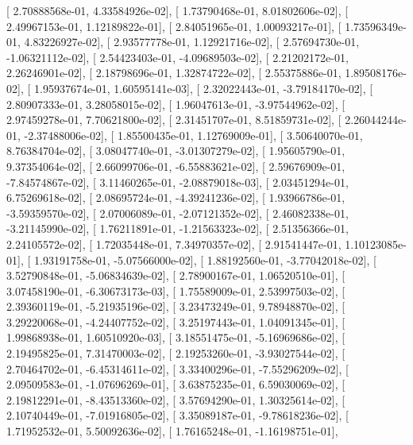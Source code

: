 \documentclass{article}
\begin{document}
       [  2.70888568e-01,   4.33584926e-02],
       [  1.73790468e-01,   8.01802606e-02],
       [  2.49967153e-01,   1.12189822e-01],
       [  2.84051965e-01,   1.00093217e-01],
       [  1.73596349e-01,   4.83226927e-02],
       [  2.93577778e-01,   1.12921716e-02],
       [  2.57694730e-01,  -1.06321112e-02],
       [  2.54423403e-01,  -4.09689503e-02],
       [  2.21202172e-01,   2.26246901e-02],
       [  2.18798696e-01,   1.32874722e-02],
       [  2.55375886e-01,   1.89508176e-02],
       [  1.95937674e-01,   1.60595141e-03],
       [  2.32022443e-01,  -3.79184170e-02],
       [  2.80907333e-01,   3.28058015e-02],
       [  1.96047613e-01,  -3.97544962e-02],
       [  2.97459278e-01,   7.70621800e-02],
       [  2.31451707e-01,   8.51859731e-02],
       [  2.26044244e-01,  -2.37488006e-02],
       [  1.85500435e-01,   1.12769009e-01],
       [  3.50640070e-01,   8.76384704e-02],
       [  3.08047740e-01,  -3.01307279e-02],
       [  1.95605790e-01,   9.37354064e-02],
       [  2.66099706e-01,  -6.55883621e-02],
       [  2.59676909e-01,  -7.84574867e-02],
       [  3.11460265e-01,  -2.08879018e-03],
       [  2.03451294e-01,   6.75269618e-02],
       [  2.08695724e-01,  -4.39241236e-02],
       [  1.93966786e-01,  -3.59359570e-02],
       [  2.07006089e-01,  -2.07121352e-02],
       [  2.46082338e-01,  -3.21145990e-02],
       [  1.76211891e-01,  -1.21563323e-02],
       [  2.51356366e-01,   2.24105572e-02],
       [  1.72035448e-01,   7.34970357e-02],
       [  2.91541447e-01,   1.10123085e-01],
       [  1.93191758e-01,  -5.07566000e-02],
       [  1.88192560e-01,  -3.77042018e-02],
       [  3.52790848e-01,  -5.06834639e-02],
       [  2.78900167e-01,   1.06520510e-01],
       [  3.07458190e-01,  -6.30673173e-03],
       [  1.75589009e-01,   2.53997503e-02],
       [  2.39360119e-01,  -5.21935196e-02],
       [  3.23473249e-01,   9.78948870e-02],
       [  3.29220068e-01,  -4.24407752e-02],
       [  3.25197443e-01,   1.04091345e-01],
       [  1.99868938e-01,   1.60510920e-03],
       [  3.18551475e-01,  -5.16969686e-02],
       [  2.19495825e-01,   7.31470003e-02],
       [  2.19253260e-01,  -3.93027544e-02],
       [  2.70464702e-01,  -6.45314611e-02],
       [  3.33400296e-01,  -7.55296209e-02],
       [  2.09509583e-01,  -1.07696269e-01],
       [  3.63875235e-01,   6.59030069e-02],
       [  2.19812291e-01,  -8.43513360e-02],
       [  3.57694290e-01,   1.30325614e-02],
       [  2.10740449e-01,  -7.01916805e-02],
       [  3.35089187e-01,  -9.78618236e-02],
       [  1.71952532e-01,   5.50092636e-02],
       [  1.76165248e-01,  -1.16198751e-01],
\end{document}
